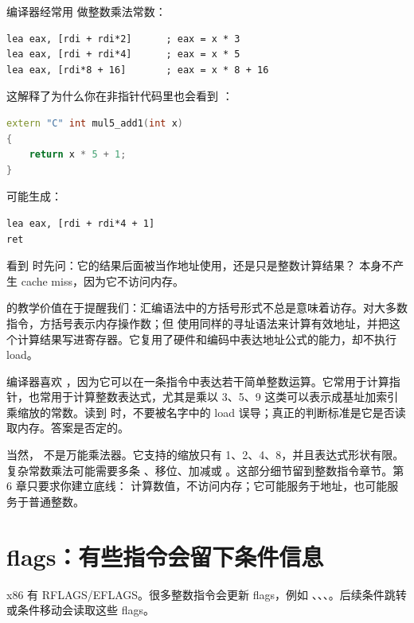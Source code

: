 编译器经常用  做整数乘法常数：

\begin{lstlisting}
lea eax, [rdi + rdi*2]      ; eax = x * 3
lea eax, [rdi + rdi*4]      ; eax = x * 5
lea eax, [rdi*8 + 16]       ; eax = x * 8 + 16
\end{lstlisting}

这解释了为什么你在非指针代码里也会看到 ：

\begin{lstlisting}[language=C++]
extern "C" int mul5_add1(int x)
{
    return x * 5 + 1;
}
\end{lstlisting}

可能生成：

\begin{lstlisting}
lea eax, [rdi + rdi*4 + 1]
ret
\end{lstlisting}

\begin{mentalmodel}
看到  时先问：它的结果后面被当作地址使用，还是只是整数计算结果？ 本身不产生 cache miss，因为它不访问内存。
\end{mentalmodel}

 的教学价值在于提醒我们：汇编语法中的方括号形式不总是意味着访存。对大多数指令，方括号表示内存操作数；但  使用同样的寻址语法来计算有效地址，并把这个计算结果写进寄存器。它复用了硬件和编码中表达地址公式的能力，却不执行 load。

编译器喜欢 ，因为它可以在一条指令中表达若干简单整数运算。它常用于计算指针，也常用于计算整数表达式，尤其是乘以 3、5、9 这类可以表示成基址加索引乘缩放的常数。读到  时，不要被名字中的 load 误导；真正的判断标准是它是否读取内存。答案是否定的。

当然， 不是万能乘法器。它支持的缩放只有 1、2、4、8，并且表达式形状有限。复杂常数乘法可能需要多条 、移位、加减或 。这部分细节留到整数指令章节。第 6 章只要求你建立底线： 计算数值，不访问内存；它可能服务于地址，也可能服务于普通整数。

\section{flags：有些指令会留下条件信息}

x86 有 RFLAGS/EFLAGS。很多整数指令会更新 flags，例如 、、、。后续条件跳转或条件移动会读取这些 flags。


